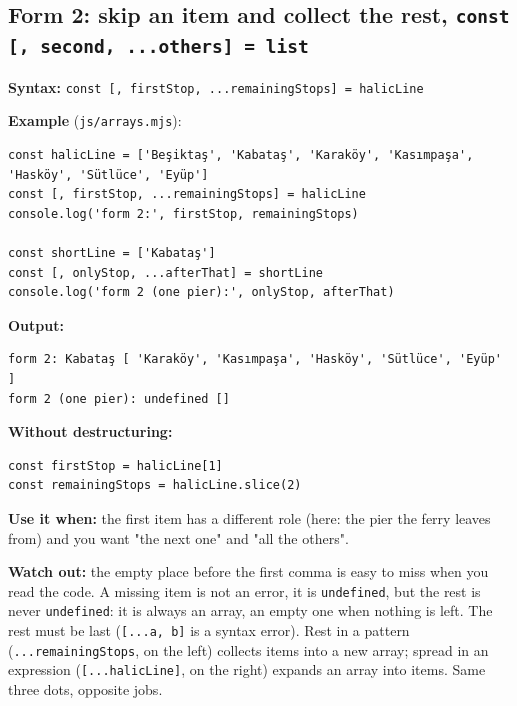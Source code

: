 \documentclass[
  10pt,
]{article}
\begin{document}
\hypertarget{form-2-skip-an-item-and-collect-the-rest-const--second-others--list}{%
\subsection{\texorpdfstring{Form 2: skip an item and collect the rest,
\texttt{const [\allowbreak{},\allowbreak{} second,\allowbreak{} .\allowbreak{}.\allowbreak{}.\allowbreak{}others] =\allowbreak{} list}}{Form 2: skip an item and collect the rest, }}\label{form-2-skip-an-item-and-collect-the-rest-const--second-others--list}}

\textbf{Syntax:}
\texttt{const [\allowbreak{},\allowbreak{} firstStop,\allowbreak{} .\allowbreak{}.\allowbreak{}.\allowbreak{}remainingStops] =\allowbreak{} halicLine}

\textbf{Example} (\texttt{js/\allowbreak{}arrays.\allowbreak{}mjs}):

\begin{verbatim}
const halicLine = ['Beşiktaş', 'Kabataş', 'Karaköy', 'Kasımpaşa', 'Hasköy', 'Sütlüce', 'Eyüp']
const [, firstStop, ...remainingStops] = halicLine
console.log('form 2:', firstStop, remainingStops)

const shortLine = ['Kabataş']
const [, onlyStop, ...afterThat] = shortLine
console.log('form 2 (one pier):', onlyStop, afterThat)
\end{verbatim}

\textbf{Output:}

\begin{verbatim}
form 2: Kabataş [ 'Karaköy', 'Kasımpaşa', 'Hasköy', 'Sütlüce', 'Eyüp' ]
form 2 (one pier): undefined []
\end{verbatim}

\textbf{Without destructuring:}

\begin{verbatim}
const firstStop = halicLine[1]
const remainingStops = halicLine.slice(2)
\end{verbatim}

\textbf{Use it when:} the first item has a different role (here: the
pier the ferry leaves from) and you want "the next one" and "all the
others".

\textbf{Watch out:} the empty place before the first comma is easy to
miss when you read the code. A missing item is not an error, it is
\texttt{undefined}, but the rest is never \texttt{undefined}: it is
always an array, an empty one when nothing is left. The rest must be
last
(\texttt{[\allowbreak{}.\allowbreak{}.\allowbreak{}.\allowbreak{}a,\allowbreak{} b]}
is a syntax error). Rest in a pattern
(\texttt{.\allowbreak{}.\allowbreak{}.\allowbreak{}remainingStops}, on
the left) collects items into a new array; spread in an expression
(\texttt{[\allowbreak{}.\allowbreak{}.\allowbreak{}.\allowbreak{}halicLine]},
on the right) expands an array into items. Same three dots, opposite
jobs.
\end{document}
